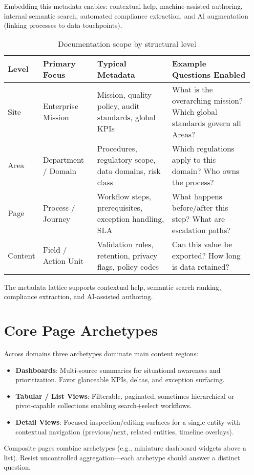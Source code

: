 Embedding this metadata enables: contextual help, machine-assisted authoring, internal semantic search, automated compliance extraction, and AI augmentation (linking processes to data touchpoints).

\begin{table}[h]
	\centering
	\caption{Documentation scope by structural level}\label{tab:doc-scope}
	\begin{tabularx}{\textwidth}{l l X X}
		\toprule
		\textbf{Level} & \textbf{Primary Focus} & \textbf{Typical Metadata} & \textbf{Example Questions Enabled} \\
		\midrule
		Site & Enterprise Mission & Mission, quality policy, audit standards, global KPIs & What is the overarching mission? Which global standards govern all Areas? \\
		Area & Department / Domain & Procedures, regulatory scope, data domains, risk class & Which regulations apply to this domain? Who owns the process? \\
		Page & Process / Journey & Workflow steps, prerequisites, exception handling, SLA & What happens before/after this step? What are escalation paths? \\
		Content & Field / Action Unit & Validation rules, retention, privacy flags, policy codes & Can this value be exported? How long is data retained? \\
		\bottomrule
	\end{tabularx}
	\vspace{0.5em}
	\footnotesize The metadata lattice supports contextual help, semantic search ranking, compliance extraction, and AI-assisted authoring.
\end{table}

\section{Core Page Archetypes}
Across domains three archetypes dominate main content regions:
\begin{itemize}
	\item \textbf{Dashboards}: Multi-source summaries for situational awareness and prioritization. Favor glanceable KPIs, deltas, and exception surfacing.
	\item \textbf{Tabular / List Views}: Filterable, paginated, sometimes hierarchical or pivot-capable collections enabling search+select workflows.
	\item \textbf{Detail Views}: Focused inspection/editing surfaces for a single entity with contextual navigation (previous/next, related entities, timeline overlays).
\end{itemize}
Composite pages combine archetypes (e.g., miniature dashboard widgets above a list). Resist uncontrolled aggregation—each archetype should answer a distinct question.

